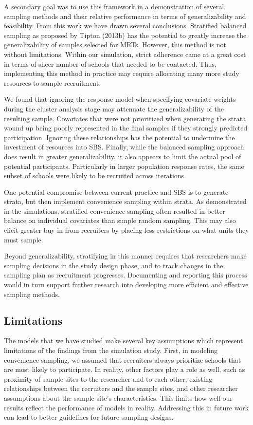 \documentclass[
  english,
  man,floatsintext]{apa6}
\begin{document}
A secondary goal was to use this framework in a demonstration of several sampling methods and their relative performance in terms of generalizability and feasibility. From this work we have drawn several conclusions. Stratified balanced sampling as proposed by Tipton (2013b) has the potential to greatly increase the generalizability of samples selected for MRTs. However, this method is not without limitations. Within our simulation, strict adherence came at a great cost in terms of sheer number of schools that needed to be contacted. Thus, implementing this method in practice may require allocating many more study resources to sample recruitment.

We found that ignoring the response model when specifying covariate weights during the cluster analysis stage may attenuate the generalizability of the resulting sample. Covariates that were not prioritized when generating the strata wound up being poorly represented in the final samples if they strongly predicted participation. Ignoring these relationships has the potential to undermine the investment of resources into SBS. Finally, while the balanced sampling approach does result in greater generalizability, it also appears to limit the actual pool of potential participants. Particularly in larger population response rates, the same subset of schools were likely to be recruited across iterations.

One potential compromise between current practice and SBS is to generate strata, but then implement convenience sampling within strata. As demonstrated in the simulations, stratified convenience sampling often resulted in better balance on individual covariates than simple random sampling. This may also elicit greater buy in from recruiters by placing less restrictions on what units they must sample.

Beyond generalizability, stratifying in this manner requires that researchers make sampling decisions in the study design phase, and to track changes in the sampling plan as recruitment progresses. Documenting and reporting this process would in turn support further research into developing more efficient and effective sampling methods.

\hypertarget{limitations}{%
\subsection{Limitations}\label{limitations}}

The models that we have studied make several key assumptions which represent limitations of the findings from the simulation study. First, in modeling convenience sampling, we assumed that recruiters always prioritize schools that are most likely to participate. In reality, other factors play a role as well, such as proximity of sample sites to the researcher and to each other, existing relationships between the recruiters and the sample sites, and other researcher assumptions about the sample site's characteristics. This limits how well our results reflect the performance of models in reality. Addressing this in future work can lead to better guidelines for future sampling designs.
\end{document}
